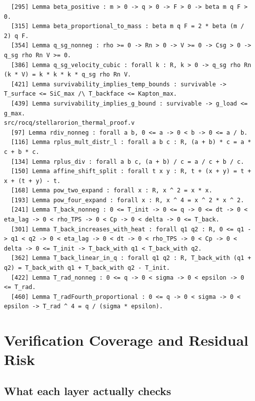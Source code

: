 \documentclass[11pt]{article}
\theoremstyle{definition}
\begin{document}
\begin{verbatim}
  [295] Lemma beta_positive : m > 0 -> q > 0 -> F > 0 -> beta m q F > 0.
  [315] Lemma beta_proportional_to_mass : beta m q F = 2 * beta (m / 2) q F.
  [354] Lemma q_sg_nonneg : rho >= 0 -> Rn > 0 -> V >= 0 -> Csg > 0 -> q_sg rho Rn V >= 0.
  [386] Lemma q_sg_velocity_cubic : forall k : R, k > 0 -> q_sg rho Rn (k * V) = k * k * k * q_sg rho Rn V.
  [421] Lemma survivability_implies_temp_bounds : survivable -> T_surface <= SiC_max /\ T_backface <= Kapton_max.
  [439] Lemma survivability_implies_g_bound : survivable -> g_load <= g_max.
src/rocq/stellarorion_thermal_proof.v
  [97] Lemma rdiv_nonneg : forall a b, 0 <= a -> 0 < b -> 0 <= a / b.
  [116] Lemma rplus_mult_distr_l : forall a b c : R, (a + b) * c = a * c + b * c.
  [134] Lemma rplus_div : forall a b c, (a + b) / c = a / c + b / c.
  [150] Lemma affine_shift_split : forall t x y : R, t + (x + y) = t + x + (t + y) - t.
  [168] Lemma pow_two_expand : forall x : R, x ^ 2 = x * x.
  [193] Lemma pow_four_expand : forall x : R, x ^ 4 = x ^ 2 * x ^ 2.
  [241] Lemma T_back_nonneg : 0 <= T_init -> 0 <= q -> 0 <= dt -> 0 < eta_lag -> 0 < rho_TPS -> 0 < Cp -> 0 < delta -> 0 <= T_back.
  [301] Lemma T_back_increases_with_heat : forall q1 q2 : R, 0 <= q1 -> q1 < q2 -> 0 < eta_lag -> 0 < dt -> 0 < rho_TPS -> 0 < Cp -> 0 < delta -> 0 <= T_init -> T_back_with q1 < T_back_with q2.
  [362] Lemma T_back_linear_in_q : forall q1 q2 : R, T_back_with (q1 + q2) = T_back_with q1 + T_back_with q2 - T_init.
  [422] Lemma T_rad_nonneg : 0 <= q -> 0 < sigma -> 0 < epsilon -> 0 <= T_rad.
  [460] Lemma T_radFourth_proportional : 0 <= q -> 0 < sigma -> 0 < epsilon -> T_rad ^ 4 = q / (sigma * epsilon).
\end{verbatim}

\section{Verification Coverage and Residual Risk}\label{sec:risk}

\subsection{What each layer actually checks}
\end{document}
